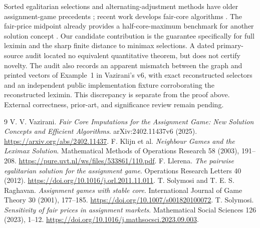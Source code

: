 \documentclass[11pt]{article}
\begin{document}
Sorted egalitarian selections and alternating-adjustment methods have
older assignment-game precedents \cite{klijn}; recent work develops
fair-core algorithms \cite{vazirani}. The fair-price midpoint already
provides a half-core-maximum benchmark for another solution concept
\cite{solymosi}. Our candidate contribution is the guarantee specifically
for full leximin and the sharp finite distance to minimax selections.
A dated primary-source audit located no equivalent quantitative theorem,
but does not certify novelty. The audit also records an apparent mismatch
between the graph and printed vectors of Example~1 in Vazirani's v6,
with exact reconstructed selectors and an independent public implementation
fixture corroborating the reconstructed leximin. This discrepancy is
separate from the proof above. External correctness, prior-art, and
significance review remain pending.

\begin{thebibliography}{9}
 V. V. Vazirani.
\emph{Fair Core Imputations for the Assignment Game: New Solution Concepts
and Efficient Algorithms}. arXiv:2402.11437v6 (2025).
\url{https://arxiv.org/abs/2402.11437}.
 F. Klijn et al.
\emph{Neighbour Games and the Leximax Solution}.
Mathematical Methods of Operations Research 58 (2003), 191--208.
\url{https://pure.uvt.nl/ws/files/533861/110.pdf}.
 F. Llerena.
\emph{The pairwise egalitarian solution for the assignment game}.
Operations Research Letters 40 (2012).
\url{https://doi.org/10.1016/j.orl.2011.11.011}.
 T. Solymosi and T. E. S. Raghavan.
\emph{Assignment games with stable core}.
International Journal of Game Theory 30 (2001), 177--185.
\url{https://doi.org/10.1007/s001820100072}.
 T. Solymosi.
\emph{Sensitivity of fair prices in assignment markets}.
Mathematical Social Sciences 126 (2023), 1--12.
\url{https://doi.org/10.1016/j.mathsocsci.2023.09.003}.
\end{thebibliography}
\end{document}
